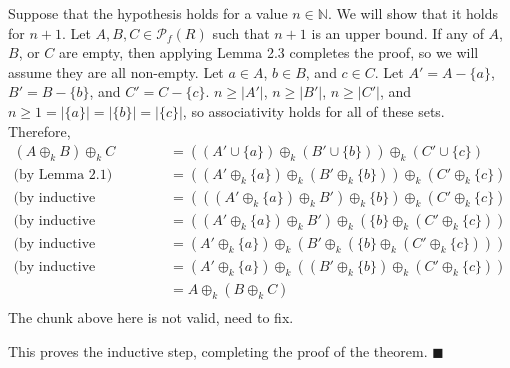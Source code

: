 \documentclass{article}
\newcommand{\abs}[1]{\left|#1\right|}
\newcommand{\N}{\mathbb{N}}
\begin{document}
Suppose that the hypothesis holds for a value $n \in \N$.
We will show that it holds for $n + 1$.
Let $A, B, C \in \mathcal{P}_f(R)$ such that $n + 1$
is an upper bound.
If any of $A$, $B$, or $C$ are empty, then applying
Lemma 2.3 completes the proof, so we will assume they are
all non-empty. Let $a \in A$, $b \in B$, and $c \in C$.
Let $A' = A - \{a\}$, $B' = B - \{b\}$, and $C' = C - \{c\}$.
$n \geq \abs{A'}$, $n \geq \abs{B'}$, $n \geq \abs{C'}$,
and $n \geq 1 = \abs{\{a\}} = \abs{\{b\}} = \abs{\{c\}}$,
so associativity holds for all of these sets. Therefore,
\[\begin{split}
    (A \oplus_k B) \oplus_k C
    &= ((A' \cup \{a\}) \oplus_k (B' \cup \{b\}))
        \oplus_k (C' \cup \{c\}) \\
    \text{(by Lemma 2.1)}\quad
    &= ((A' \oplus_k \{a\}) \oplus_k (B' \oplus_k \{b\}))
        \oplus_k (C' \oplus_k \{c\}) \\
    \text{(by inductive hypothesis)}\quad
    &= (((A' \oplus_k \{a\}) \oplus_k B') \oplus_k \{b\})
        \oplus_k (C' \oplus_k \{c\}) \\
    \text{(by inductive hypothesis)}\quad
    &= ((A' \oplus_k \{a\}) \oplus_k B') \oplus_k
        (\{b\} \oplus_k (C' \oplus_k \{c\})) \\
    \text{(by inductive hypothesis)}\quad
    &= (A' \oplus_k \{a\}) \oplus_k (B' \oplus_k
        (\{b\} \oplus_k (C' \oplus_k \{c\}))) \\
    \text{(by inductive hypothesis)}\quad
    &= (A' \oplus_k \{a\}) \oplus_k ((B' \oplus_k
        \{b\}) \oplus_k (C' \oplus_k \{c\})) \\
    &= A \oplus_k (B \oplus_k C) \\
\end{split}\]
The chunk above here is not valid, need to fix.

This proves the inductive step, completing the proof of
the theorem.
$\blacksquare$
\end{document}

